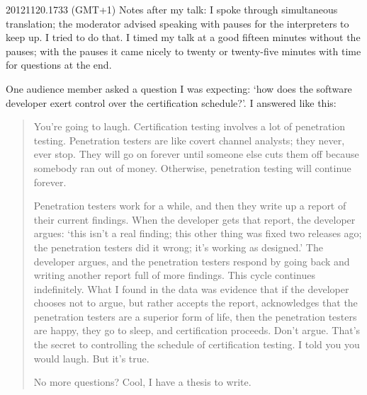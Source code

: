 \item{20121120.1733 (GMT+1)} Notes after my talk: I spoke through simultaneous translation; the
moderator advised speaking with pauses for the interpreters to keep up.  I tried to do that.  I
timed my talk at a good fifteen minutes without the pauses; with the pauses it came nicely to
twenty or twenty-five minutes with time for questions at the end.

One audience member asked a question I was expecting: `how does the software developer exert
control over the certification schedule?'.  I answered like this:
\begin{quotation}
	You're going to laugh.  Certification testing involves a lot of penetration testing.
Penetration testers are like covert channel analysts; they never, ever stop.  They will go on
forever until someone else cuts them off because somebody ran out of money.  Otherwise, penetration
testing will continue forever.

	Penetration testers work for a while, and then they write up a report of their current findings.
When the developer gets that report, the developer argues: `this isn't a real finding; this other
thing was fixed two releases ago; the penetration testers did it wrong; it's working as designed.'
The developer argues, and the penetration testers respond by going back and writing another report
full of more findings.  This cycle continues indefinitely.  What I found in the data was evidence
that if the developer chooses not to argue, but rather accepts the report, acknowledges that the
penetration testers are a superior form of life, then the penetration testers are happy, they go to
sleep, and certification proceeds.  Don't argue.  That's the secret to controlling the schedule of
certification testing.  I told you you would laugh.  But it's true.

	No more questions?  Cool, I have a thesis to write.
\end{quotation}

